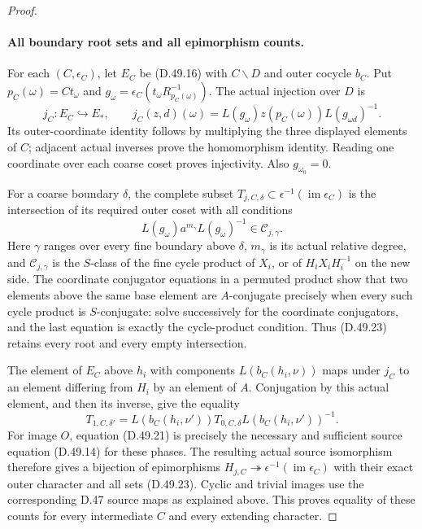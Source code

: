 \begin{proof}
\paragraph{All boundary root sets and all epimorphism counts.}
For each \((C,\epsilon_C)\), let \(E_C\) be
\textup{(D.49.16)} with \(C\backslash D\) and outer cocycle \(b_C\).
Put \(p_C(\omega)=Ct_\omega\) and
\(g_\omega=\epsilon_C(t_\omega R_{p_C(\omega)}^{-1})\).
The actual injection over \(D\) is
\[
 j_C:E_C\hookrightarrow E_*,\qquad
 j_C(z,d)(\omega)
    =L(g_\omega)z(p_C(\omega))L(g_{\omega d})^{-1}.
 \tag{D.49.22}
\]
Its outer-coordinate identity follows by multiplying the three
displayed elements of \(C\); adjacent actual inverses prove the
homomorphism identity. Reading one coordinate over each coarse
coset proves injectivity. Also \(g_{\omega_0}=0\).

For a coarse boundary \(\delta\), the complete subset
\(T_{j,C,\delta}\subset\epsilon^{-1}(\operatorname{im}\epsilon_C)\)
is the intersection of its required outer coset with all conditions
\[
       L(g_\omega)a^{m_\gamma}L(g_\omega)^{-1}
                       \in\mathcal C_{j,\gamma}.
 \tag{D.49.23}
\]
Here \(\gamma\) ranges over every fine boundary above \(\delta\),
\(m_\gamma\) is its actual relative degree, and
\(\mathcal C_{j,\gamma}\) is the \(S\)-class of the fine cycle
product of \(X_i\), or of \(H_iX_iH_i^{-1}\) on the new side.
The coordinate conjugator equations in a permuted product show that
two elements above the same base element are \(A\)-conjugate
precisely when every such cycle product is \(S\)-conjugate:
solve successively for the coordinate conjugators, and the last
equation is exactly the cycle-product condition.
Thus \textup{(D.49.23)} retains every root and every empty
intersection.

The element of \(E_C\) above \(h_i\) with components
\(L(b_C(h_i,\nu))\) maps under \(j_C\) to an element differing
from \(H_i\) by an element of \(A\). Conjugation by this actual
element, and then its inverse, give the equality
\[
 T_{1,C,\delta'}=
 L(b_C(h_i,\nu'))T_{0,C,\delta}L(b_C(h_i,\nu'))^{-1}.
 \tag{D.49.24}
\]
For image \(O\), equation \textup{(D.49.21)} is precisely the
necessary and sufficient source equation \textup{(D.49.14)} for
these phases. The resulting actual source isomorphism therefore
gives a bijection of epimorphisms
\(H_{j,C}\twoheadrightarrow\epsilon^{-1}(\operatorname{im}\epsilon_C)\)
with their exact outer character and all sets
\textup{(D.49.23)}. Cyclic and trivial images use the corresponding
D.47 source maps as explained above. This proves equality of these
counts for every intermediate \(C\) and every extending character.


\end{proof}
